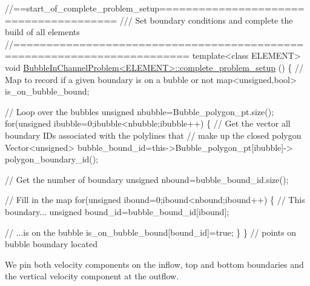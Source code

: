  
\begin{DoxyCodeInclude}
\textcolor{comment}{//==start\_of\_complete\_problem\_setup=======================================}
\textcolor{comment}{/// Set boundary conditions and complete the build of all elements}
\textcolor{comment}{}\textcolor{comment}{//========================================================================}
\textcolor{keyword}{template}<\textcolor{keyword}{class} ELEMENT>
\textcolor{keywordtype}{void} \hyperlink{classBubbleInChannelProblem_a7b3c042477f4ee4e62dd1e00e1a480f8}{BubbleInChannelProblem<ELEMENT>::complete\_problem\_setup}
      ()
\{      
 \textcolor{comment}{// Map to record if a given boundary is on a bubble or not}
 map<unsigned,bool> is\_on\_bubble\_bound;
 
 \textcolor{comment}{// Loop over the bubbles }
 \textcolor{keywordtype}{unsigned} nbubble=Bubble\_polygon\_pt.size();
 \textcolor{keywordflow}{for}(\textcolor{keywordtype}{unsigned} ibubble=0;ibubble<nbubble;ibubble++)
  \{
   \textcolor{comment}{// Get the vector all boundary IDs associated with the polylines that}
   \textcolor{comment}{// make up the closed polygon}
   Vector<unsigned> bubble\_bound\_id=this->Bubble\_polygon\_pt[ibubble]->
    polygon\_boundary\_id();
   
   \textcolor{comment}{// Get the number of boundary}
   \textcolor{keywordtype}{unsigned} nbound=bubble\_bound\_id.size();
   
   \textcolor{comment}{// Fill in the map}
   \textcolor{keywordflow}{for}(\textcolor{keywordtype}{unsigned} ibound=0;ibound<nbound;ibound++)
    \{
     \textcolor{comment}{// This boundary...}
     \textcolor{keywordtype}{unsigned} bound\_id=bubble\_bound\_id[ibound];
     
     \textcolor{comment}{// ...is on the bubble}
     is\_on\_bubble\_bound[bound\_id]=\textcolor{keyword}{true};
    \}
  \} \textcolor{comment}{// points on bubble boundary located}

\end{DoxyCodeInclude}


We pin both velocity components on the inflow, top and bottom boundaries and the vertical velocity component at the outflow.


